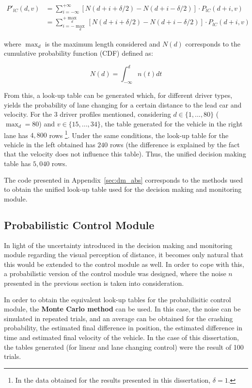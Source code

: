 \begin{equation}
\begin{aligned}
	P'_{lC}(d,v) & = \sum_{i = -\infty}^{+\infty} [N(d + i + \delta/2) - N(d + i - \delta/2)] \cdot P_{lC}(d + i,v) \\
	& = \sum_{i = -\max_d}^{+\max_d} [N(d + i + \delta/2) - N(d + i - \delta/2)] \cdot P_{lC}(d + i,v)
\end{aligned}
\end{equation}

where $\max_d$ is the maximum length considered and $N(d)$ corresponds to the cumulative probability function (CDF) defined as:

\begin{equation}
	N(d) = \int_{-\infty}^d n(t) dt
\end{equation}

From this, a look-up table can be generated which, for different driver types, yields the probability of lane changing for a certain distance to the lead car and velocity. For the 3 driver profiles mentioned, considering $d \in \{1,...,80\}$ ($\max_d = 80$) and $v \in \{15,...,34\}$, the table generated for the vehicle in the right lane has $4,800$ rows \footnote{In the data obtained for the results presented in this dissertation, $\delta = 1$.}. Under the same conditions, the look-up table for the vehicle in the left obtained has $240$ rows (the difference is explained by the fact that the velocity does not influence this table). Thus, the unified decision making table has $5,040$ rows.

The code presented in Appendix~\ref{sec:dm_abs} corresponds to the methods used to obtain the unified look-up table used for the decision making and monitoring module.

\subsection{Probabilistic Control Module}
\label{sec:prob_control}

In light of the uncertainty introduced in the decision making and monitoring module regarding the visual perception of distance, it becomes only natural that this would be extended to the control module as well. In order to cope with this, a probabilistic version of the control module was designed, where the noise $n$ presented in the previous section is taken into consideration. 

In order to obtain the equivalent look-up tables for the probabilisitic control module, the \textbf{Monte Carlo method} can be used. In this case, the noise can be simulated in repeated trials, and an average can be obtained for the crashing probability, the estimated final difference in position, the estimated difference in time and estimated final velocity of the vehicle. In the case of this dissertation, the tables generated (for linear and lane changing control) were the result of 100 trials.

